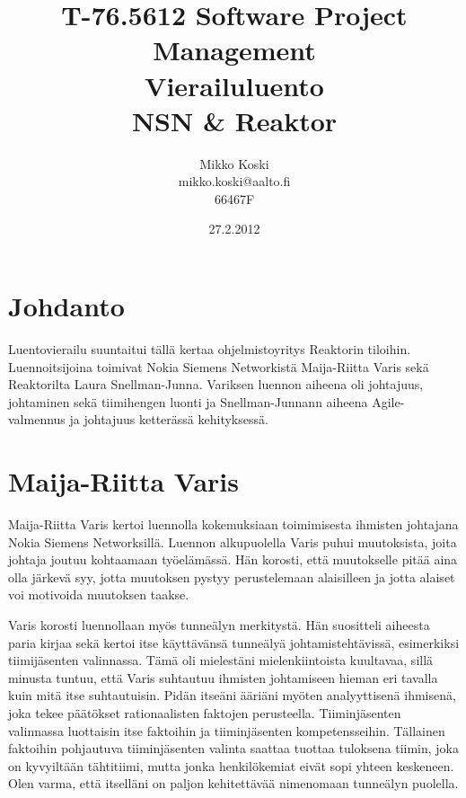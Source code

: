 \documentclass[a4paper]{article}
\begin{document}
\title{\small T-76.5612 Software Project Management \\ Vierailuluento \\ \huge NSN \& Reaktor}
\date{27.2.2012}
\author{Mikko Koski \\ mikko.koski@aalto.fi \\ 66467F}
\maketitle

\normalsize

\section{Johdanto}

Luentovierailu suuntaitui tällä kertaa ohjelmistoyritys Reaktorin tiloihin. Luennoitsijoina toimivat Nokia Siemens Networkistä Maija-Riitta Varis sekä Reaktorilta Laura Snellman-Junna. Variksen luennon aiheena oli johtajuus, johtaminen sekä tiimihengen luonti ja Snellman-Junnann aiheena Agile-valmennus ja johtajuus ketterässä kehityksessä.

\section{Maija-Riitta Varis}

Maija-Riitta Varis kertoi luennolla kokemuksiaan toimimisesta ihmisten johtajana Nokia Siemens Networksillä. Luennon alkupuolella Varis puhui muutoksista, joita johtaja joutuu kohtaamaan työelämässä. Hän korosti, että muutokselle pitää aina olla järkevä syy, jotta muutoksen pystyy perustelemaan alaisilleen ja jotta alaiset voi motivoida muutoksen taakse.

Varis korosti luennollaan myös tunneälyn merkitystä. Hän suositteli aiheesta paria kirjaa sekä kertoi itse käyttävänsä tunneälyä johtamistehtävissä, esimerkiksi tiimijäsenten valinnassa. Tämä oli mielestäni mielenkiintoista kuultavaa, sillä minusta tuntuu, että Varis suhtautuu ihmisten johtamiseen hieman eri tavalla kuin mitä itse suhtautuisin. Pidän itseäni ääriäni myöten analyyttisenä ihmisenä, joka tekee päätökset rationaalisten faktojen perusteella. Tiiminjäsenten valinnassa luottaisin itse faktoihin ja tiiminjäsenten kompetensseihin. Tällainen faktoihin pohjautuva tiiminjäsenten valinta saattaa tuottaa tuloksena tiimin, joka on kyvyiltään tähtitiimi, mutta jonka henkilökemiat eivät sopi yhteen keskeneen. Olen varma, että itselläni on paljon kehitettävää nimenomaan tunneälyn puolella.
\end{document}
